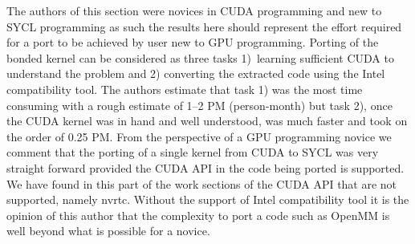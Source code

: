 \documentclass[../main]{subfiles}
\begin{document}
The authors of this section were novices in CUDA programming and new to SYCL programming as such the results here should represent the effort required for a port to be achieved by user new to GPU programming.
Porting of the bonded kernel can be considered as three tasks 1)~learning sufficient CUDA to understand the problem and 2) converting the extracted code using the Intel compatibility tool.
The authors estimate that task 1) was the most time consuming with a rough estimate of 1--2 PM (person-month) but task 2), once the CUDA kernel was in hand and well understood, was much faster and took on the order of 0.25 PM.
From the perspective of a GPU programming novice we comment that the porting of a single kernel from CUDA to SYCL was very straight forward provided the CUDA API in the code being ported is supported.
We have found in this part of the work sections of the CUDA API that are not supported, namely nvrtc.
Without the support of Intel compatibility tool it is the opinion of this author that the complexity to port a code such as OpenMM is well beyond what is possible for a novice.
\end{document}
